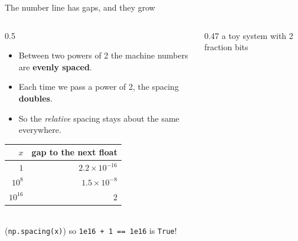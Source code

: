\documentclass[aspectratio=169]{beamer}
\begin{document}
\begin{frame}{The number line has gaps, and they grow}
\begin{columns}[c]
\begin{column}{0.5\textwidth}
\small
\begin{itemize}
  \item Between two powers of 2 the machine numbers are \textbf{evenly spaced}.
  \item Each time we pass a power of 2, the spacing \textbf{doubles}.
  \item So the \emph{relative} spacing stays about the same everywhere.
\end{itemize}
\vspace{0.2cm}
\centering
\begin{tabular}{rr}
\toprule
$x$ & gap to the next float \\
\midrule
$1$ & $2.2\times10^{-16}$ \\
$10^{8}$ & $1.5\times10^{-8}$ \\
$10^{16}$ & $2$ \\
\bottomrule
\end{tabular}\\[3pt]
\scriptsize (\texttt{np.spacing(x)}) \quad so \texttt{1e16 + 1 == 1e16} is \texttt{True}!
\end{column}
\begin{column}{0.47\textwidth}
\centering
\small a toy system with 2 fraction bits\\[4pt]
\end{column}
\end{columns}
\end{frame}
\end{document}
